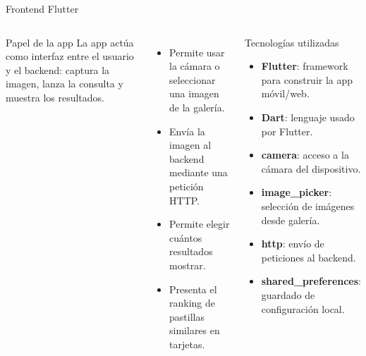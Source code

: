 \documentclass[aspectratio=169,11pt]{beamer}
\begin{document}
\begin{frame}{Frontend Flutter}
  \begin{columns}[c,onlytextwidth]


      \begin{block}{Papel de la app}
      La app actúa como interfaz entre el usuario y el backend: captura la imagen, lanza la consulta y muestra los resultados.
      \end{block}

      \vspace{0.25cm}

      \begin{itemize}
        \setlength\itemsep{0.18cm}
        \item Permite usar la cámara o seleccionar una imagen de la galería.
        \item Envía la imagen al backend mediante una petición HTTP.
        \item Permite elegir cuántos resultados mostrar.
        \item Presenta el ranking de pastillas similares en tarjetas.
      \end{itemize}


      \begin{block}{Tecnologías utilizadas}
      \begin{itemize}
        \setlength\itemsep{0.16cm}
        \item \textbf{Flutter}: framework para construir la app móvil/web.
        \item \textbf{Dart}: lenguaje usado por Flutter.
        \item \textbf{camera}: acceso a la cámara del dispositivo.
        \item \textbf{image\_picker}: selección de imágenes desde galería.
        \item \textbf{http}: envío de peticiones al backend.
        \item \textbf{shared\_preferences}: guardado de configuración local.
      \end{itemize}
      \end{block}

  \end{columns}
\end{frame}
\end{document}
